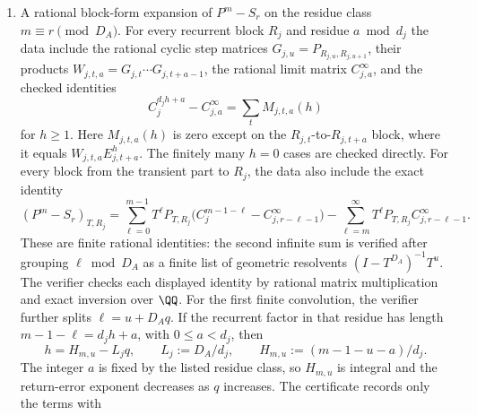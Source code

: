 \begin{theorem}
\begin{enumerate}[label=\textup{(\roman*)}]
    \(A\in\{T\}\cup\{E_{j,t}\}_{j,t}\), with
    \(\rho(A)<\gamma_A<\tau_r\) for \(A=T\) and
    \(\rho(A)<\gamma_A<\tau_r^{d_j}\) for \(A=E_{j,t}\). The verifier
    checks, using the same isolating rectangles and rational interval
    arithmetic, that every rectangle lies strictly inside the circle
    \(|z|=\gamma_A\) and supplies a positive rational distance
    \(\Delta_\xi\) from the rectangle to that circle. Therefore
    \[
      |\det(zI-A)|\ge \prod_{\xi}\Delta_\xi=:\delta_A
      \qquad(|z|=\gamma_A),
    \]
    with roots counted with algebraic multiplicity. The verifier also
    checks the elementary coefficient bound
    \[
      \|\operatorname{adj}(zI-A)\|_\infty\le U_A,
    \]
    and hence that \(\|A^n\|_\infty\le L_A\gamma_A^n\) for all
    \(n\ge0\).
    \item A rational block-form expansion of \(P^m-S_r\) on the residue
    class \(m\equiv r\pmod {D_A}\). For every recurrent block \(R_j\)
    and residue \(a\bmod d_j\) the data include the rational cyclic step
    matrices \(G_{j,u}=P_{R_{j,u},R_{j,u+1}}\), their products
    \(W_{j,t,a}=G_{j,t}\cdots G_{j,t+a-1}\), the rational limit matrix
    \(C_{j,a}^{\infty}\), and the checked identities
    \[
      C_j^{d_jh+a}-C_{j,a}^{\infty}
      =
      \sum_t M_{j,t,a}(h)
    \]
    for \(h\ge1\). Here \(M_{j,t,a}(h)\) is zero except on the
    \(R_{j,t}\)-to-\(R_{j,t+a}\) block, where it equals
    \(W_{j,t,a}E_{j,t+a}^h\). The finitely many \(h=0\) cases are
    checked directly. For every block from the transient part to \(R_j\),
    the data also include the exact identity
    \[
      (P^m-S_r)_{T,R_j}
      =
      \sum_{\ell=0}^{m-1}
        T^\ell P_{T,R_j}
        \bigl(C_j^{m-1-\ell}-C_{j,r-\ell-1}^{\infty}\bigr)
      -
      \sum_{\ell=m}^{\infty}
        T^\ell P_{T,R_j}C_{j,r-\ell-1}^{\infty}.
    \]
    These are finite rational identities: the second infinite sum is
    verified after grouping \(\ell\bmod D_A\) as a finite list of
    geometric resolvents \((I-T^{D_A})^{-1}T^u\). The verifier checks
    each displayed identity by rational matrix multiplication and exact
    inversion over \(\QQ\). For the first finite convolution, the
    verifier further splits \(\ell=u+D_Aq\). If the recurrent factor in
    that residue has length \(m-1-\ell=d_jh+a\), with
    \(0\le a<d_j\), then
    \[
      h=H_{m,u}-L_jq,\qquad
      L_j:=D_A/d_j,\qquad
      H_{m,u}:=(m-1-u-a)/d_j .
    \]
    The integer \(a\) is fixed by the listed residue class, so
    \(H_{m,u}\) is integral and the return-error exponent decreases as
    \(q\) increases. The certificate records only the terms with

\end{enumerate}
\end{theorem}
